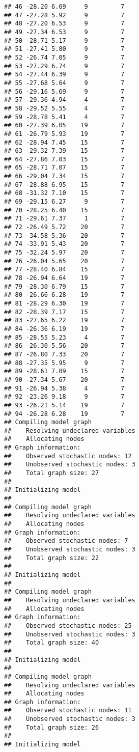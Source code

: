 \documentclass[
]{article}
\begin{document}
\begin{verbatim}
## 46 -28.20 6.69     9         7
## 47 -27.28 5.92     9         7
## 48 -27.20 6.53     9         7
## 49 -27.34 6.53     9         7
## 50 -28.71 5.17     9         7
## 51 -27.41 5.80     9         7
## 52 -26.74 7.05     9         7
## 53 -27.29 6.74     9         7
## 54 -27.44 6.39     9         7
## 55 -27.68 5.64     9         7
## 56 -29.16 5.69     9         7
## 57 -29.36 4.94     4         7
## 58 -29.52 5.55     4         7
## 59 -28.78 5.41     4         7
## 60 -27.39 6.05    19         7
## 61 -26.79 5.93    19         7
## 62 -28.94 7.45    15         7
## 63 -29.32 7.39    15         7
## 64 -27.86 7.03    15         7
## 65 -28.71 7.07    15         7
## 66 -29.04 7.34    15         7
## 67 -28.88 6.95    15         7
## 68 -31.32 7.10    15         7
## 69 -29.15 6.27     9         7
## 70 -28.25 6.40    15         7
## 71 -29.61 7.37     1         7
## 72 -26.49 5.72    20         7
## 73 -34.58 5.36    20         7
## 74 -33.91 5.43    20         7
## 75 -32.24 5.97    20         7
## 76 -26.04 5.65    20         7
## 77 -28.40 6.84    15         7
## 78 -26.94 6.64    19         7
## 79 -28.30 6.79    15         7
## 80 -26.66 6.28    19         7
## 81 -28.29 6.30    19         7
## 82 -28.39 7.17    15         7
## 83 -27.65 6.22    19         7
## 84 -26.36 6.19    19         7
## 85 -28.55 5.23     4         7
## 86 -26.30 5.56    20         7
## 87 -26.80 7.33    20         7
## 88 -27.35 5.95     9         7
## 89 -28.61 7.09    15         7
## 90 -27.34 5.67    20         7
## 91 -26.94 5.38     4         7
## 92 -23.26 9.18     9         7
## 93 -26.21 5.14    19         7
## 94 -26.28 6.28    19         7
## Compiling model graph
##    Resolving undeclared variables
##    Allocating nodes
## Graph information:
##    Observed stochastic nodes: 12
##    Unobserved stochastic nodes: 3
##    Total graph size: 27
## 
## Initializing model
## 
## Compiling model graph
##    Resolving undeclared variables
##    Allocating nodes
## Graph information:
##    Observed stochastic nodes: 7
##    Unobserved stochastic nodes: 3
##    Total graph size: 22
## 
## Initializing model
## 
## Compiling model graph
##    Resolving undeclared variables
##    Allocating nodes
## Graph information:
##    Observed stochastic nodes: 25
##    Unobserved stochastic nodes: 3
##    Total graph size: 40
## 
## Initializing model
## 
## Compiling model graph
##    Resolving undeclared variables
##    Allocating nodes
## Graph information:
##    Observed stochastic nodes: 11
##    Unobserved stochastic nodes: 3
##    Total graph size: 26
## 
## Initializing model

\end{verbatim}
\end{document}
